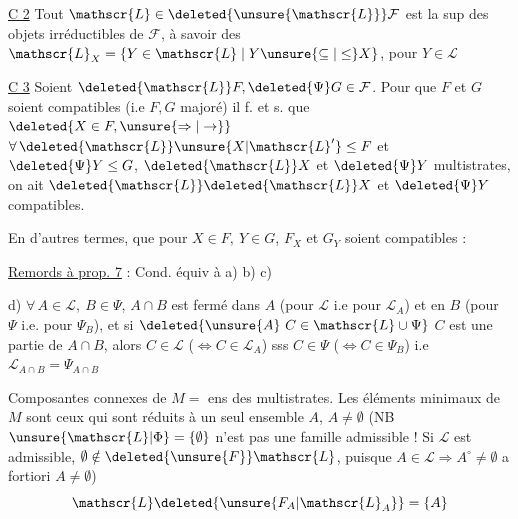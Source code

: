 \uline{C 2} Tout $\mathscr{L}\in\deleted{\unsure{\mathscr{L}}}\mathcal F$ est la sup des objets irréductibles de $\mathcal F$, à savoir des $\mathscr{L}_{X}=\{Y\in\mathscr{L}\mid Y\unsure{\subseteq|\leq}X\}$, pour $Y\in\mathscr{L}$

\uline{C 3} Soient $\deleted{\mathscr{L}}F,\deleted{\Psi}G\in\mathcal F$. Pour que $F$ et $G$ soient compatibles (i.e $F,G$ majoré) il f. et s. que $\deleted{X\in F,\unsure{\Rightarrow|\to}}$ $\forall\,\deleted{\mathscr{L}}\unsure{X|{\mathscr{L}}'}\leq F$ et $\deleted{\Psi}Y\leq G$, $\deleted{\mathscr{L}}X$ et $\deleted{\Psi}Y$  multistrates, on ait $\deleted{\mathscr{L}}\deleted{\mathscr{L}}X$ et $\deleted{\Psi}Y$ compatibles.

En d'autres termes, que pour $X\in F,\ Y\in G$, $F_X$ et $G_Y$ soient compatibles :

\uline{Remords à prop.  7} : Cond. équiv à a) b) c)

d)  $\forall\,A\in\mathscr{L},\ B\in\Psi$, $A\cap B$ est fermé dans $A$ (pour $\mathscr{L}$ i.e pour $\mathscr{L}_A$) et en $B$ (pour $\Psi$ i.e. pour $\Psi_B$), et si $\deleted{\unsure{A}\ C\in\mathscr{L}\cup\Psi}$ $C$ est une partie de $A\cap B$, alors $C\in\mathscr{L}$ ($\Leftrightarrow C\in\mathscr{L}_A$) sss $C\in\Psi$ ($\Leftrightarrow C\in\Psi_B$) i.e $\mathscr{L}_{A\cap B}=\Psi_{A\cap B}$

Composantes connexes de $M=$ ens des multistrates. Les éléments minimaux de $M$ sont ceux qui sont réduits à un seul ensemble $A$,  $A\ne\emptyset$ (NB $\unsure{\mathscr{L}|\Phi}=\{\emptyset\}$ n'est pas une famille admissible !\deleted{)} Si $\mathscr{L}$ est admissible, $\emptyset\notin\deleted{\unsure{F}}\mathscr{L}$, \deleted{)} puisque $A\in\mathscr{L}\Rightarrow A^{\circ}\ne\emptyset$ a fortiori $A\ne\emptyset$)
\[
\mathscr{L}\deleted{\unsure{F_{A}|\mathscr{L}_{A}}}=\{A\}
\]

 

